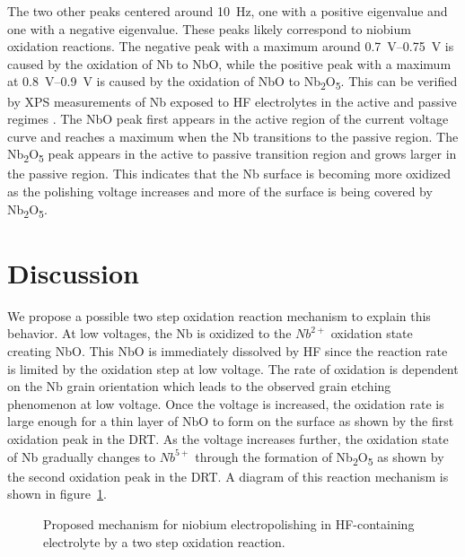 The two other peaks centered around \qty{10}{\hertz}, one with a positive eigenvalue and one with a negative eigenvalue. These peaks likely correspond to niobium oxidation reactions. The negative peak with a maximum around \qtyrange{0.7}{0.75}{\volt} is caused by the oxidation of Nb to NbO, while the positive peak with a maximum at \qtyrange{0.8}{0.9}{\volt} is caused by the oxidation of NbO to Nb\textsubscript{2}O\textsubscript{5}. This can be verified by XPS measurements of Nb exposed to HF electrolytes in the active and passive regimes \cite{ranjith2018anodic}. The NbO peak first appears in the active region of the current voltage curve and reaches a maximum when the Nb transitions to the passive region. The Nb\textsubscript{2}O\textsubscript{5} peak appears in the active to passive transition region and grows larger in the passive region. This indicates that the Nb surface is becoming more oxidized as the polishing voltage increases and more of the surface is being covered by Nb\textsubscript{2}O\textsubscript{5}. 






\section{Discussion}

We propose a possible two step oxidation reaction mechanism to explain this behavior. At low voltages, the Nb is oxidized to the $Nb^{2+}$ oxidation state creating NbO. This NbO is immediately dissolved by HF since the reaction rate is limited by the oxidation step at low voltage. The rate of oxidation is dependent on the Nb grain orientation which leads to the observed grain etching phenomenon at low voltage. Once the voltage is increased, the oxidation rate is large enough for a thin layer of NbO to form on the surface as shown by the first oxidation peak in the DRT. As the voltage increases further, the oxidation state of Nb gradually changes to $Nb^{5+}$ through the formation of Nb\textsubscript{2}O\textsubscript{5} as shown by the second oxidation peak in the DRT. A diagram of this reaction mechanism is shown in figure~\ref{fig:diagram}.




\begin{figure}
  \centering
  
  
  \caption{Proposed mechanism for niobium electropolishing in HF-containing electrolyte by a two step oxidation reaction.}
  \label{fig:diagram}
\end{figure}




